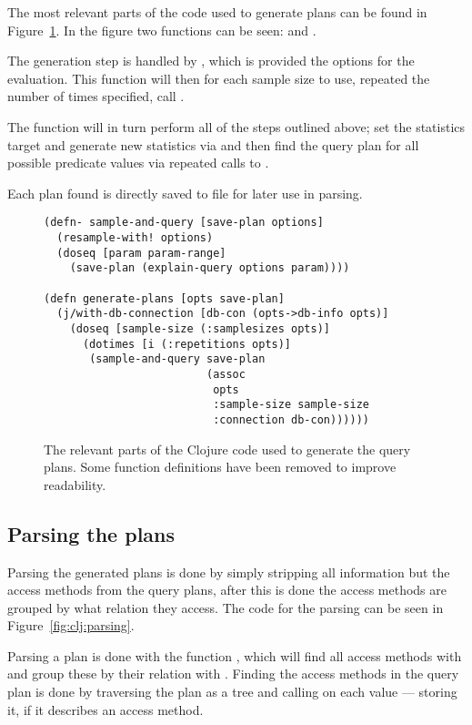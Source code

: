 The most relevant parts of the code used to generate plans can be found in
Figure~\ref{fig:clj:generating}. In the figure two functions can be seen:
 and .

The generation step is handled by , which is provided the
options for the evaluation. This function will then for each sample size to use,
repeated the number of times specified, call .

The  function will in turn perform all of the steps
outlined above; set the statistics target and generate new statistics via
 and then find the query plan for all possible predicate
values via repeated calls to .

Each plan found is directly saved to file for later use in parsing.

\begin{figure}[ht]
  \begin{verbatim}
(defn- sample-and-query [save-plan options]
  (resample-with! options)
  (doseq [param param-range]
    (save-plan (explain-query options param))))

(defn generate-plans [opts save-plan]
  (j/with-db-connection [db-con (opts->db-info opts)]
    (doseq [sample-size (:samplesizes opts)]
      (dotimes [i (:repetitions opts)]
       (sample-and-query save-plan
                         (assoc
                          opts
                          :sample-size sample-size
                          :connection db-con))))))
   \end{verbatim}
   \caption[The Clojure code to generate all query plans]{The relevant parts of the
     Clojure code used to generate the query plans. Some function definitions
     have been removed to improve readability.}
\label{fig:clj:generating}
\end{figure}

\subsection{Parsing the plans}\label{sec:parsing}
Parsing the generated plans is done by simply stripping all information but the
access methods from the query plans, after this is done the access methods are
grouped by what relation they access. The code for the parsing can be seen in
Figure~\ref{fig:clj:parsing}.

Parsing a plan is done with the function , which will find all
access methods with  and group these by their relation
with . Finding the access methods in the query plan is
done by traversing the plan as a tree and calling 
on each value --- storing it, if it describes an access method.

